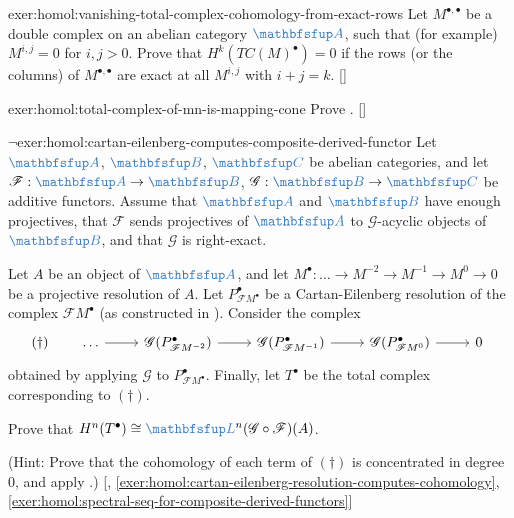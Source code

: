 \begin{exer}{\exerused{}}{exer:homol:vanishing-total-complex-cohomology-from-exact-rows}
  Let $M^{\bullet,\bullet}$ be a double complex on an abelian category
  $\categ{A}$, such that (for example) $M^{i,j} = 0$ for $i, j >
  0$. Prove that $H^k(TC(M)^\bullet) = 0$ if the rows (or the columns)
  of $M^{\bullet,\bullet}$ are exact at all $M^{i,j}$ with
  $i + j = k$. []
\end{exer}
\begin{exer}{\exerused{}}{exer:homol:total-complex-of-mn-is-mapping-cone}
  Prove
  . []
\end{exer}
\begin{exer}{$\lnot$}{exer:homol:cartan-eilenberg-computes-composite-derived-functor}
  Let $\categ{A}$, $\categ{B}$, $\categ{C}$ be abelian categories, and
  let $\mathscr{F} : \categ{A} \to \categ{B}$,
  $\mathscr{G} : \categ{B} \to \categ{C}$ be additive functors. Assume
  that $\categ{A}$ and $\categ{B}$ have enough projectives, that
  $\mathscr{F}$ sends projectives of $\categ{A}$ to
  $\mathscr{G}$-acyclic objects of $\categ{B}$, and that $\mathscr{G}$
  is right-exact.

  Let $A$ be an object of $\categ{A}$, and let
  $M^\bullet : \dots \to M^{-2} \to M^{-1} \to M^0 \to 0$ be a
  projective resolution of $A$. Let $P_{\mathscr{F}M^\bullet}^\bullet$
  be a Cartan-Eilenberg resolution of the complex
  $\mathscr{F}M^\bullet$ (as constructed in
  ). Consider the complex
  \[
    (\dagger) \qquad
    \begin{tikzcd}
      \dots \arrow[r] & \mathscr{G}(P_{\mathscr{F}M^{-2}}^\bullet)
      \arrow[r] & \mathscr{G}(P_{\mathscr{F}M^{-1}}^\bullet) \arrow[r]
      & \mathscr{G}(P_{\mathscr{F}M^0}^\bullet) \arrow[r] & 0
    \end{tikzcd}
  \]
  obtained by applying $\mathscr{G}$ to
  $P_{\mathscr{F}M^\bullet}^\bullet$.  Finally, let $T^\bullet$ be the
  total complex corresponding to $(\dagger)$.

  Prove that
  $H^n(T^\bullet) \cong \categ{L}^n(\mathscr{G} \circ
  \mathscr{F})(A)$.

  (Hint: Prove that the cohomology of each term of $(\dagger)$ is
  concentrated in degree $0$, and apply .)
  [,
  \ref{exer:homol:cartan-eilenberg-resolution-computes-cohomology},
  \ref{exer:homol:spectral-seq-for-composite-derived-functors}]
\end{exer}
